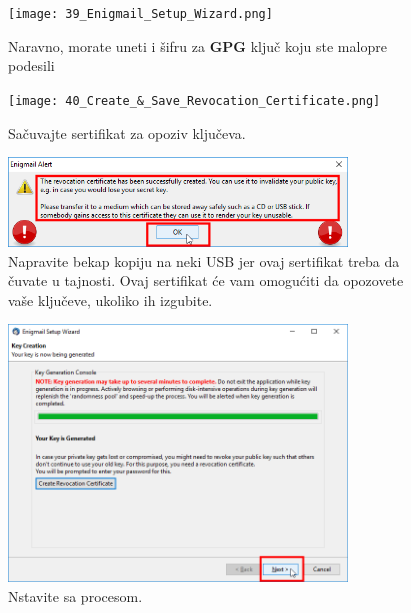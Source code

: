 \documentclass[a4paper,11pt]{article}
\begin{document}
\begin{figure}[!h]
	\begin{center}
		\texttt{[image: 39\_Enigmail\_Setup\_Wizard.png]}
		\caption{Naravno, morate uneti i \v{s}ifru za \textbf{GPG} klju\v{c} koju ste malopre podesili}
		\label{enigmail_setup_wizard6}
	\end{center}
\end{figure}
\newpage
\begin{figure}[!h]
	\begin{center}
		\texttt{[image: 40\_Create\_\&\_Save\_Revocation\_Certificate.png]}
		\caption{Sa\v{c}uvajte sertifikat za opoziv klju\v{c}eva.}
		\label{enigmail_setup_wizard7}
	\end{center}
\end{figure}

\begin{figure}[!h]
	\begin{center}
		\includegraphics[width=9cm]{41_Enigmail_Alert.png}
		\caption{Napravite bekap kopiju na neki USB jer ovaj sertifikat treba da \v{c}uvate u tajnosti.
		\newline Ovaj sertifikat \'{c}e vam omogu\'c{}iti da opozovete va\v{s}e klju\v{c}eve, ukoliko ih izgubite.}
		\label{enigmail_setup_wizard8}
	\end{center}
\end{figure}
\newpage
\begin{figure}[!h]
	\begin{center}
		\includegraphics[width=9cm]{42_Enigmail_Setup_Wizard.png}
		\caption{Nstavite sa procesom.}
		\label{enigmail_setup_wizard9}
	\end{center}
\end{figure}
\end{document}

